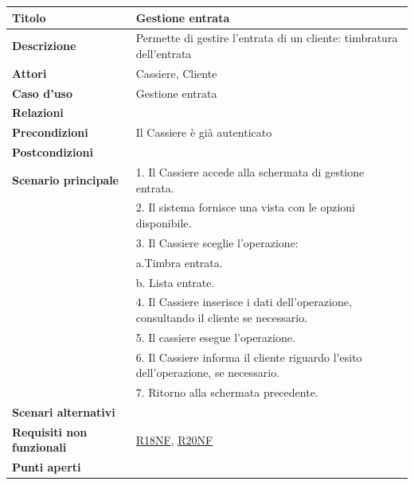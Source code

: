 \documentclass[a4paper]{article}
\begin{document}
\begin{center}
\begin{tabularx}{1\textwidth}{|l|X|}
    \hline
	\textbf{Titolo} & Gestione entrata \\
	\hline
	\textbf{Descrizione} & Permette di gestire l'entrata di un cliente: timbratura dell'entrata \\
	\hline
	\textbf{Attori} & Cassiere, Cliente \\
	\hline
	\textbf{Caso d'uso} & Gestione entrata \\
	\hline
	\textbf{Relazioni} & \\
	\hline
	\textbf{Precondizioni} & Il Cassiere è già autenticato \\
	\hline
	\textbf{Postcondizioni} &  \\
	\hline
	\textbf{Scenario principale} & 1. Il Cassiere accede alla schermata di gestione entrata. \\
								 & 2. Il sistema fornisce una vista con le opzioni disponibile.\\
								 & 3. Il Cassiere sceglie l'operazione:\\
								 & \quad a.Timbra entrata.\\
								 & \quad b. Lista entrate.\\
								 & 4. Il Cassiere inserisce i dati dell'operazione, consultando il cliente se necessario.\\
								 & 5. Il cassiere esegue l'operazione.\\
								 & 6. Il Cassiere informa il cliente riguardo l'esito dell'operazione, se necessario.\\
								 & 7. Ritorno alla schermata precedente.\\
	\hline
	\textbf{Scenari alternativi} & \\
	\hline
	\textbf{Requisiti non funzionali} & \hyperlink{R18NF}{R18NF}, \hyperlink{R20NF}{R20NF} \\
	\hline
	\textbf{Punti aperti} & \\
	\hline
\end{tabularx}
\end{center}

\end{document}
